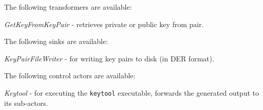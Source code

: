 \documentclass[a4paper]{book}
\begin{document}
\noindent The following transformers are available:
\begin{tight_itemize}
  \item \textit{GetKeyFromKeyPair} - retrieves private or public key from pair.
\end{tight_itemize}

\noindent The following sinks are available:
\begin{tight_itemize}
  \item \textit{KeyPairFileWriter} - for writing key pairs to disk (in DER format).
\end{tight_itemize}

\noindent The following control actors are available:
\begin{tight_itemize}
  \item \textit{Keytool} - for executing the \verb|keytool| executable, forwards
  the generated output to its sub-actors.
\end{tight_itemize}


\end{document}
